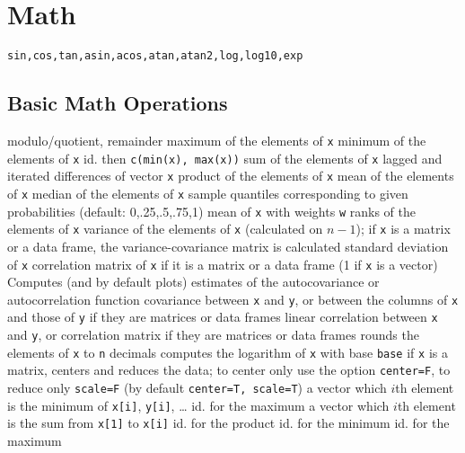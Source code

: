 \section{Math}{{\tt sin,cos,tan,asin,acos,atan,atan2,log,log10,exp}}

\subsection{Basic Math Operations}{}
\cmdS{\%\%, \%/\%}	{modulo/quotient, remainder}
	{ maximum of the elements of {\tt x}}
	{ minimum of the elements of {\tt x}}
	{ id. then {\tt c(min(x), max(x))}}
	{ sum of the elements of {\tt x}}
	{ lagged and iterated differences of vector {\tt x}}
	{ product of the elements of {\tt x}}
	{ mean of the elements of {\tt x}}
	{ median of the elements of {\tt x}}
	{sample quantiles corresponding to given
    probabilities (default: 0,.25,.5,.75,1)}
	{mean of {\tt x} with weights {\tt w}}
	{ ranks of the elements of {\tt x}}
	{variance of the elements of {\tt x}
    (calculated on $n-1$); if {\tt x} is a matrix or a data frame, the
    variance-covariance matrix is calculated}
	{standard deviation of {\tt x}}
	{correlation matrix of {\tt x} if it is a matrix or a data frame (1 if {\tt x} is a vector)}
	{Computes (and by default plots) estimates of the autocovariance or autocorrelation function}
	{covariance between {\tt x} and {\tt y}, or between the columns of {\tt x} and those of {\tt y} if they are matrices or data frames}
	{linear correlation between {\tt x} and {\tt y}, or correlation matrix if they are matrices or data frames}
	{rounds the elements of {\tt x} to {\tt n} decimals}
	{computes the logarithm of {\tt x} with base {\tt base}}
	{if {\tt x} is a matrix, centers and reduces the data; to
center only use the option {\tt center=F}, to reduce only {\tt scale=F}
(by default {\tt center=T, scale=T})}
	{ a vector which $i$th element is the minimum of {\tt x[i]}, {\tt y[i]}, \ldots}
	{ id. for the maximum}
	{a vector which $i$th element is the sum from {\tt x[1]} to {\tt x[i]}}
	{ id. for the product}
	{ id. for the minimum}
	{ id. for the maximum}

